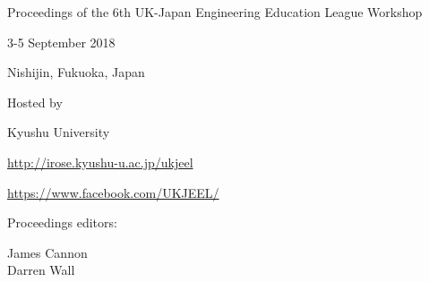 Proceedings of the 6th UK-Japan Engineering Education League Workshop

3-5 September 2018

Nishijin, Fukuoka, Japan

Hosted by

Kyushu University

\url{http://irose.kyushu-u.ac.jp/ukjeel}

\url{https://www.facebook.com/UKJEEL/}

Proceedings editors:

James Cannon\\
Darren Wall
